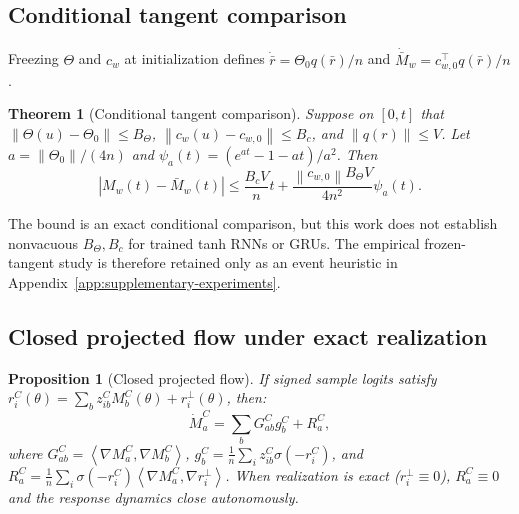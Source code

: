 \documentclass{article}
\newtheorem{theorem}{Theorem}
\newtheorem{proposition}{Proposition}
\theoremstyle{definition}
\theoremstyle{remark}
\newcommand{\ip}[2]{\left\langle #1,#2\right\rangle}
\newcommand{\norm}[1]{\left\lVert #1\right\rVert}
\newcommand{\sigm}{\sigma}
\begin{document}
\subsection{Conditional tangent comparison}
Freezing $\Theta$ and $c_w$ at initialization defines $\dot{\bar r}=\Theta_0q(\bar r)/n$ and $\dot{\bar M}_w=c_{w,0}^\top q(\bar r)/n$.
\begin{theorem}[Conditional tangent comparison]
\label{thm:tangent-bound}
Suppose on $[0,t]$ that $\norm{\Theta(u)-\Theta_0}\le B_\Theta$, $\norm{c_w(u)-c_{w,0}}\le B_c$, and $\norm{q(r)}\le V$. Let $a=\norm{\Theta_0}/(4n)$ and $\psi_a(t)=(e^{at}-1-at)/a^2$. Then
\begin{equation}
 |M_w(t)-\bar M_w(t)|\le\frac{B_cV}{n}t+
 \frac{\norm{c_{w,0}}B_\Theta V}{4n^2}\psi_a(t).
 \label{eq:tangent-bound}
\end{equation}
\end{theorem}
The bound is an exact conditional comparison, but this work does not establish nonvacuous $B_\Theta,B_c$ for trained tanh RNNs or GRUs. The empirical frozen-tangent study is therefore retained only as an event heuristic in Appendix~\ref{app:supplementary-experiments}.

\subsection{Closed projected flow under exact realization}
\begin{proposition}[Closed projected flow]
\label{prop:app-projected}
If signed sample logits satisfy $r_i^C(\theta) = \sum_b z_{ib}^C M_b^C(\theta) + r_i^\perp(\theta)$, then:
\begin{equation}
  \dot M_a^C = \sum_b G_{ab}^C g_b^C + R_a^C,
  \label{eq:app-projected-flow}
\end{equation}
where $G_{ab}^C = \ip{\nabla M_a^C}{\nabla M_b^C}$, $g_b^C = \frac1n \sum_i z_{ib}^C \sigm(-r_i^C)$, and $R_a^C = \frac1n \sum_i \sigm(-r_i^C) \ip{\nabla M_a^C}{\nabla r_i^\perp}$.
When realization is exact ($r_i^\perp \equiv 0$), $R_a^C \equiv 0$ and the response dynamics close autonomously.
\end{proposition}
\end{document}
